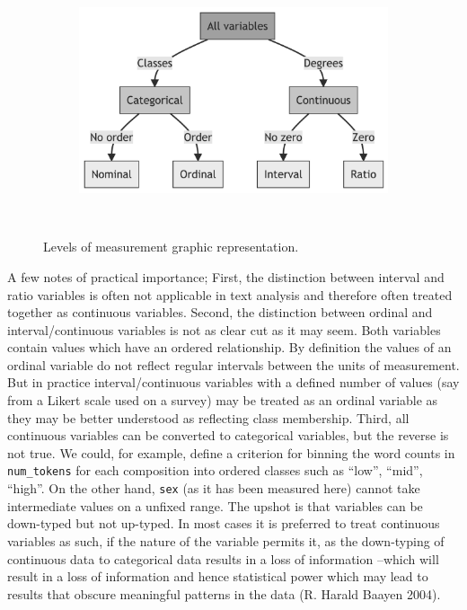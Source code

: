 \documentclass[
  letterpaper,
]{scrbook}
\begin{document}
\begin{figure}

{\centering 

\begin{figure}[H]

{\centering \includegraphics[width=4.68in,height=2.82in]{./approaching-analysis_files/figure-latex/mermaid-figure-1.png}

}

\end{figure}

}

\caption{\label{fig-intro-values}Levels of measurement graphic
representation.}

\end{figure}

A few notes of practical importance; First, the distinction between
interval and ratio variables is often not applicable in text analysis
and therefore often treated together as continuous variables. Second,
the distinction between ordinal and interval/continuous variables is not
as clear cut as it may seem. Both variables contain values which have an
ordered relationship. By definition the values of an ordinal variable do
not reflect regular intervals between the units of measurement. But in
practice interval/continuous variables with a defined number of values
(say from a Likert scale used on a survey) may be treated as an ordinal
variable as they may be better understood as reflecting class
membership. Third, all continuous variables can be converted to
categorical variables, but the reverse is not true. We could, for
example, define a criterion for binning the word counts in
\texttt{num\_tokens} for each composition into ordered classes such as
``low'', ``mid'', ``high''. On the other hand, \texttt{sex} (as it has
been measured here) cannot take intermediate values on a unfixed range.
The upshot is that variables can be down-typed but not up-typed. In most
cases it is preferred to treat continuous variables as such, if the
nature of the variable permits it, as the down-typing of continuous data
to categorical data results in a loss of information --which will result
in a loss of information and hence statistical power which may lead to
results that obscure meaningful patterns in the data (R. Harald Baayen
2004).
\end{document}
